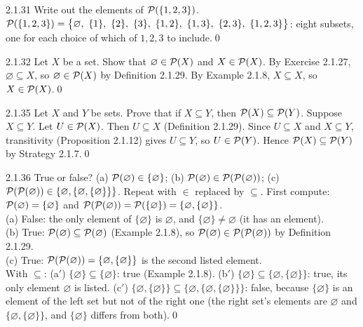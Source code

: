 \begin{bookex}[essential]{2.1.31}
Write out the elements of $\mathcal{P}(\{1,2,3\})$.
\solution
$\PS(\{1,2,3\})=\big\{\varnothing,\ \{1\},\ \{2\},\ \{3\},\ \{1,2\},\ \{1,3\},\ \{2,3\},\ \{1,2,3\}\big\}$: eight subsets, one for each choice of which of $1,2,3$ to include.\qed
\end{bookex}

\begin{bookex}[recommended]{2.1.32}
Let $X$ be a set. Show that $\varnothing\in\mathcal{P}(X)$ and $X\in\mathcal{P}(X)$.
\solution
By Exercise 2.1.27, $\varnothing\subseteq X$, so $\varnothing\in\mathcal{P}(X)$ by Definition 2.1.29. By Example 2.1.8, $X\subseteq X$, so $X\in\mathcal{P}(X)$.\qed
\end{bookex}

\begin{bookex}[essential]{2.1.35}
Let $X$ and $Y$ be sets. Prove that if $X\subseteq Y$, then $\mathcal{P}(X)\subseteq\mathcal{P}(Y)$.
\solution
Suppose $X\subseteq Y$. Let $U\in\mathcal{P}(X)$. Then $U\subseteq X$ (Definition 2.1.29). Since $U\subseteq X$ and $X\subseteq Y$, transitivity (Proposition 2.1.12) gives $U\subseteq Y$, so $U\in\mathcal{P}(Y)$. Hence $\mathcal{P}(X)\subseteq\mathcal{P}(Y)$ by Strategy 2.1.7.\qed
\end{bookex}

\begin{bookex}[recommended]{2.1.36}
True or false? (a) $\mathcal{P}(\varnothing)\in\{\varnothing\}$; (b) $\mathcal{P}(\varnothing)\in\mathcal{P}(\mathcal{P}(\varnothing))$; (c) $\mathcal{P}(\mathcal{P}(\varnothing))\in\{\varnothing,\{\varnothing,\{\varnothing\}\}\}$. Repeat with $\in$ replaced by $\subseteq$.
\solution
First compute: $\mathcal{P}(\varnothing)=\{\varnothing\}$ and $\mathcal{P}(\mathcal{P}(\varnothing))=\mathcal{P}(\{\varnothing\})=\{\varnothing,\{\varnothing\}\}$.\\
(a) False: the only element of $\{\varnothing\}$ is $\varnothing$, and $\{\varnothing\}\ne\varnothing$ (it has an element).\\
(b) True: $\mathcal{P}(\varnothing)\subseteq\mathcal{P}(\varnothing)$ (Example 2.1.8), so $\mathcal{P}(\varnothing)\in\mathcal{P}(\mathcal{P}(\varnothing))$ by Definition 2.1.29.\\
(c) True: $\mathcal{P}(\mathcal{P}(\varnothing))=\{\varnothing,\{\varnothing\}\}$ is the second listed element.\\
With $\subseteq$: (a$'$) $\{\varnothing\}\subseteq\{\varnothing\}$: true (Example 2.1.8). (b$'$) $\{\varnothing\}\subseteq\{\varnothing,\{\varnothing\}\}$: true, its only element $\varnothing$ is listed. (c$'$) $\{\varnothing,\{\varnothing\}\}\subseteq\{\varnothing,\{\varnothing,\{\varnothing\}\}\}$: false, because $\{\varnothing\}$ is an element of the left set but not of the right one (the right set's elements are $\varnothing$ and $\{\varnothing,\{\varnothing\}\}$, and $\{\varnothing\}$ differs from both).\qed
\end{bookex}

